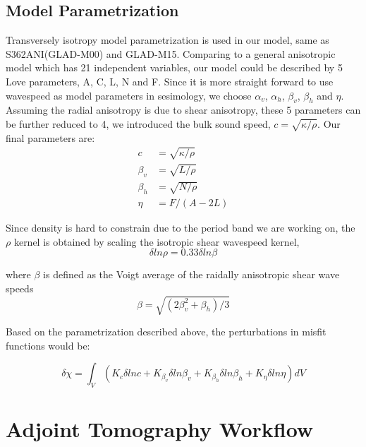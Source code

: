\documentclass[extra,mreferee]{gji}
\begin{document}
\subsection{Model Parametrization}
Transversely isotropy model parametrization is used in our model, same as S362ANI(GLAD-M00)
and GLAD-M15. Comparing to a general anisotropic model which has 21 independent variables,
our model could be described by 5 Love parameters, A, C, L, N and F\citep{love2013treatise}.
Since it is more straight forward to use  wavespeed as model parameters in sesimology,
we choose $\alpha_v$, $\alpha_h$, $\beta_v$, $\beta_h$ and $\eta$.
Assuming the radial anisotropy is due to shear anisotropy, these 5 parameters
can be further reduced to 4, we introduced the bulk sound speed,
$c=\sqrt{\kappa/\rho}$. Our final parameters are:\\
\begin{align*}
      c &= \sqrt{\kappa/\rho} \\
\beta_v &= \sqrt{L/\rho} \\
\beta_h &= \sqrt{N/\rho} \\
\eta & = F/(A-2L)
\end{align*}

Since density is hard to constrain due to the period band we are working on, the $\rho$ kernel is obtained by scaling the isotropic shear wavespeed kernel\citep{montagner1989petrological},\\
\begin{equation*}
    \delta ln\rho = 0.33\delta ln\beta
\end{equation*}

where $\beta$ is defined as the Voigt average of the raidally anisotropic shear wave speeds\citep{babuska1991seismic}
$$\beta = \sqrt{(2\beta_v^2 + \beta_h)/3}$$

Based on the parametrization described above, the perturbations in misfit functions would be:

\begin{equation*}
    \delta \chi = \int_V
      (K_c\delta lnc + K_{\beta_v}\delta ln\beta_v + K_{\beta_h}\delta ln\beta_h +
      K_\eta \delta ln\eta) dV
\end{equation*}

\section{Adjoint Tomography Workflow}
\end{document}
